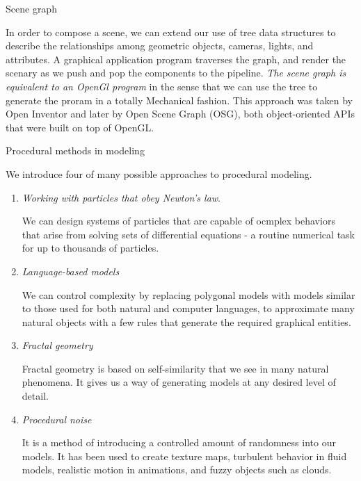 \documentclass[10pt,a4paper]{article}
\begin{document}
	\begin{enumerate}	
		{\large \item Scene graph}
		
		In order to compose a scene, we can extend our use of tree data structures to describe the relationships among geometric objects, cameras, lights, and attributes. A graphical application program traverses the graph, and render the scenary as we push and pop the components to the pipeline. \textit{The scene graph is equivalent to an OpenGl program} in the sense that we can use the tree to generate the proram in a totally Mechanical fashion. This approach was taken by Open Inventor and later by Open Scene Graph (OSG), both object-oriented APIs that were built on top of OpenGL.\\
		
		{\large \item Procedural methods in modeling}
		
		We introduce four of many possible approaches to procedural modeling.
		
		\begin{enumerate}
			\item \textit{Working with particles that obey Newton's law}.
			
			We can design systems of particles that are capable of ocmplex behaviors that arise from solving sets of differential equations - a routine numerical task for up to thousands of particles.
			
			\item \textit{Language-based models}
			
			We can control complexity by replacing polygonal models with models similar to those used for both natural and computer languages, to approximate many natural objects with a few rules that generate the required graphical entities.
			
			\item \textit{Fractal geometry}
			
			Fractal geometry is based on self-similarity that we see in many natural phenomena. It gives us a way of generating models at any desired level of detail.
			
			\item \textit{Procedural noise}
			
			It is a method of introducing a controlled amount of randomness into our models. It has been used to create texture maps, turbulent behavior in fluid models, realistic motion in animations, and fuzzy objects such as clouds.
		\end{enumerate}
		

\end{enumerate}
\end{document}
